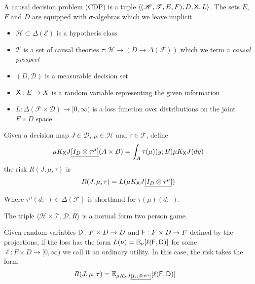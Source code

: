 \begin{definition}\label{def:CDP}
A causal decision problem (CDP) is a tuple $\langle (\mathscr{H}, \mathscr{T}, E, F), D, \mathsf{X}, L \rangle$. The sets $E$, $F$ and $D$ are equipped with $\sigma$-algebras which we leave implicit.

\begin{itemize}
    \item $\mathscr{H}\subset \Delta(\mathcal{E})$ is a hypothesis class
    \item $\mathscr{T}$ is a set of causal theories $\tau:\mathscr{H}\to ( D\to \Delta(\mathcal{F}))$ which we term a \emph{causal prospect}
    \item $(D,\mathcal{D})$ is a measurable decision set
    \item $\mathsf{X}:E\to X$ is a random variable representing the given information
    \item $L:\Delta(\mathcal{F}\times\mathcal{D})\to [0,\infty)$ is a loss function over distributions on the joint $F\times D$ space
\end{itemize}

Given a decision map $J\in\mathscr{D}$, $\mu\in \mathscr{H}$ and $\tau\in \mathscr{T}$, define 
\begin{align}
    \mu K_{\mathsf{X}} J\underline{[I_D\otimes \tau^\mu]}(A\times B) = \int_A \tau(\mu)(y;B) \mu K_{\mathsf{X}} J(dy)
\end{align}
the risk $R(J,\mu,\tau)$ is
\begin{align}
    R(J,\mu,\tau) = L(\mu K_{\mathsf{X}} J\underline{[I_D\otimes \tau^\mu]}) 
\end{align}

Where $\tau^\mu(d;\cdot)\in \Delta(\mathcal{F})$ is shorthand for $\tau(\mu)(d;\cdot)$.

The triple $\langle \mathscr{H}\times\mathscr{T}, \mathscr{D}, R\rangle$ is a normal form two person game.

Given random variables $\mathsf{D}:F\times D\to D$ and $\mathsf{F}:F\times D\to F$ defined by the projections, if the loss has the form $L(\nu) = \mathbb{E}_{\nu}[\ell(\mathsf{F},\mathsf{D})]$ for some $\ell:F\times D\to [0,\infty)$ we call it an ordinary utility. In this case, the risk takes the form
\begin{align}
    R(J,\mu,\tau) &= \mathbb{E}_{\mu K_{\mathsf{X}} J\underline{[I_D\otimes \tau^\mu]}}[\ell(\mathsf{F},\mathsf{D})]
\end{align}


\end{definition}

